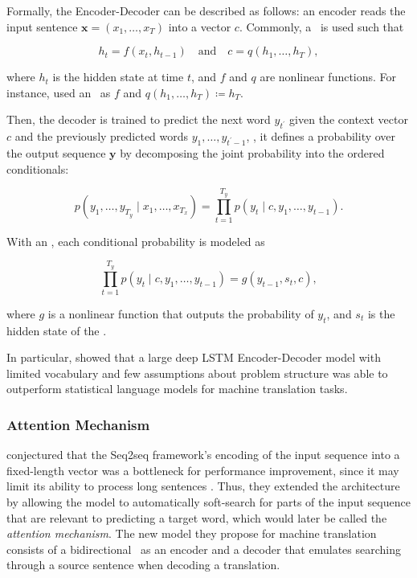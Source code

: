 Formally, the Encoder-Decoder can be described as follows: an encoder reads the input sentence $\mathbf{x} = (x_1, \dots, x_T)$ into a vector $c$. Commonly, a \rnn\ is used such that

$$ h_t = f(x_t, h_{t-1}) \quad \text{and} \quad c = q(h_1, \dots, h_T),$$

where $h_t$ is the hidden state at time $t$, and $f$ and $q$ are nonlinear functions. For instance, \citet{sutskever2014sequence} used an \lstm\ as $f$ and $q(h_1, \dots, h_T) \coloneqq h_T$.

Then, the decoder  is trained to predict the next word $y_{t^\prime}$ given the context vector $c$ and the previously predicted words $y_1, \dots, y_{t^\prime - 1}$, \ie, it defines a probability over the output sequence $\mathbf{y}$ by decomposing the joint probability into the ordered conditionals:

\[ p \left(y_1, \dots, y_{T_y} \mid x_1, \dots, x_{T_x}\right) = \prod_{t=1}^{T_y} p\left(y_t \mid c, y_1, \dots, y_{t-1} \right) . \]

With an \rnn, each conditional probability is modeled as

\[ \prod_{t=1}^{T_y} p\left(y_t \mid c, y_1, \dots, y_{t-1} \right) = g\left(y_{t-1}, s_t, c \right) , \]

where $g$ is a nonlinear function that outputs the probability of $y_t$, and $s_t$ is the hidden state of the \rnn.

In particular, \citet{sutskever2014sequence} showed that a large deep LSTM Encoder-Decoder model with limited vocabulary and few assumptions about problem structure was able to outperform statistical language models for machine translation tasks. 

\subsubsection{Attention Mechanism}
\citet{bahdanau2014neural} conjectured that the Seq2seq framework's encoding of the input sequence into a fixed-length vector was a bottleneck for performance improvement, since it may limit its ability to process long sentences \citep{cho2014learning}. Thus, they extended the architecture by allowing the model to automatically soft-search for parts of the input sequence that are relevant to predicting a target word, which would later be called the \emph{attention mechanism}. The new model they propose for machine translation consists of a bidirectional \rnn\ as an encoder and a decoder that emulates searching through a source sentence when decoding a translation.


